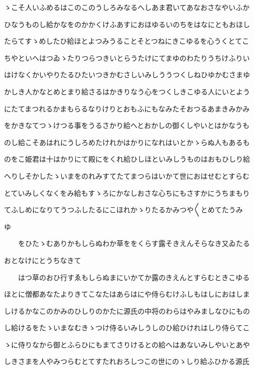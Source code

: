 \documentclass[a4paper,11pt,landscape]{ltjtarticle}
\begin{document}
ゝこそ人いふめるはこのこのうしろみなるへしあま君いてあなおさなやいふか
\par\medskip
ひなうものし給かなをのかかくけふあすにおほゆるいのちをはなにともおほし
\par\medskip
たらてすゝめしたひ給ほとよつみうることそとつねにきこゆるを心うくとてこ
\par\medskip
ちやといへはつゐゝたりつらつきいとらうたけにてまゆのわたりうちけふりい
\par\medskip
はけなくかいやりたるひたいつきかむさしいみしううつくしねひゆかむさまゆ
\par\medskip
かしき人かなとめとまり給さるはかきりなう心をつくしきこゆる人にいとよう
\par\medskip
にたてまつれるかまもらるなりけりとおもふにもなみたそおつるあまきみかみ
\par\medskip
をかきなてつゝけつる事をうるさかり給へとおかしの御くしやいとはかなうも
\par\medskip
のし給こそあはれにうしろめたけれかはかりになれはいとかゝらぬ人もあるも
\par\medskip
のをこ姫君は十はかりにて殿にをくれ給ひしほといみしうものはおもひしり給
\par\medskip
へりしそかしたゝいまをのれみすてたてまつらはいかて世におはせむとすらむ
\par\medskip
とていみしくなくをみ給もすゝろにかなしおさな心ちにもさすかにうちまもり
\par\medskip
てふしめになりてうつふしたるにこほれかゝりたるかみつや〱とめてたうみ
\par\medskip
ゆ
\par\medskip
　　をひたゝむありかもしらぬわか草ををくらす露そきえんそらなき又ゐたる
\par\medskip
おとなけにとうちなきて
\par\medskip
　　はつ草のおひ行すゑもしらぬまにいかてか露のきえんとすらむときこゆる
\par\medskip
ほとに僧都あなたよりきてこなたはあらはにや侍らむけふしもはしにおはしま
\par\medskip
しけるかなこのかみのひしりのかたに源氏の中将のわらはやみましなひにもの
\par\medskip
し給けるをたゝいまなむきゝつけ侍るいみしうしのひ給ひけれはしり侍らてこ
\par\medskip
ゝに侍りなから御とふらひにもまてさりけるとの給へはあないみしやいとあや
\par\medskip
しきさまを人やみつらむとてすたれおろしつこの世にのゝしり給ふひかる源氏
\par\medskip
\end{document}
